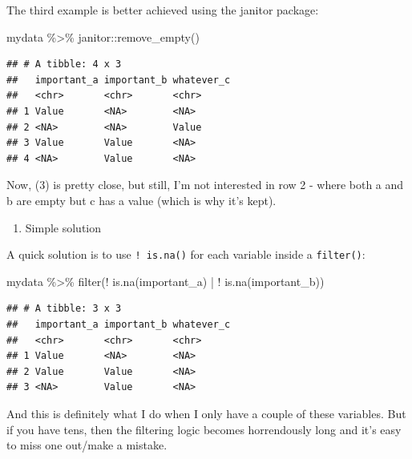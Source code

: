 \documentclass[
]{book}
\newenvironment{Shaded}{\begin{snugshade}}{\end{snugshade}}
\newcommand{\FunctionTok}[1]{\textcolor[rgb]{0.00,0.00,0.00}{#1}}
\newcommand{\NormalTok}[1]{#1}
\newcommand{\SpecialCharTok}[1]{\textcolor[rgb]{0.00,0.00,0.00}{#1}}
\providecommand{\tightlist}{%
  \setlength{\itemsep}{0pt}\setlength{\parskip}{0pt}}
\begin{document}
The third example is better achieved using the janitor package:

\begin{Shaded}
\begin{Highlighting}[]
\NormalTok{mydata }\SpecialCharTok{\%\textgreater{}\%} 
\NormalTok{  janitor}\SpecialCharTok{::}\FunctionTok{remove\_empty}\NormalTok{()}
\end{Highlighting}
\end{Shaded}

\begin{verbatim}
## # A tibble: 4 x 3
##   important_a important_b whatever_c
##   <chr>       <chr>       <chr>     
## 1 Value       <NA>        <NA>      
## 2 <NA>        <NA>        Value     
## 3 Value       Value       <NA>      
## 4 <NA>        Value       <NA>
\end{verbatim}

Now, (3) is pretty close, but still, I'm not interested in row 2 - where both a and b are empty but c has a value (which is why it's kept).

\begin{enumerate}
\def\labelenumi{(\arabic{enumi})}
\setcounter{enumi}{3}
\tightlist
\item
  Simple solution
\end{enumerate}

A quick solution is to use \texttt{!\ is.na()} for each variable inside a \texttt{filter()}:

\begin{Shaded}
\begin{Highlighting}[]
\NormalTok{mydata }\SpecialCharTok{\%\textgreater{}\%} 
  \FunctionTok{filter}\NormalTok{(}\SpecialCharTok{!} \FunctionTok{is.na}\NormalTok{(important\_a) }\SpecialCharTok{|} \SpecialCharTok{!} \FunctionTok{is.na}\NormalTok{(important\_b))}
\end{Highlighting}
\end{Shaded}

\begin{verbatim}
## # A tibble: 3 x 3
##   important_a important_b whatever_c
##   <chr>       <chr>       <chr>     
## 1 Value       <NA>        <NA>      
## 2 Value       Value       <NA>      
## 3 <NA>        Value       <NA>
\end{verbatim}

And this is definitely what I do when I only have a couple of these variables. But if you have tens, then the filtering logic becomes horrendously long and it's easy to miss one out/make a mistake.
\end{document}
